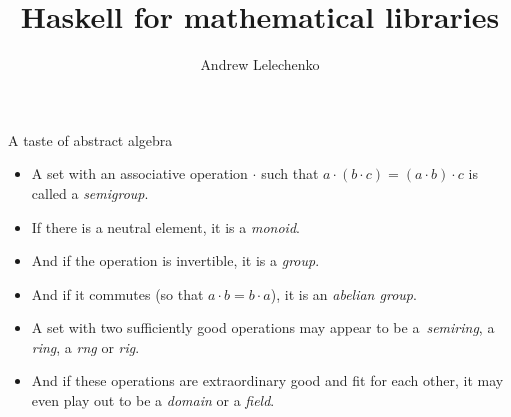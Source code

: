 \documentclass[handout]{beamer}
\begin{document}
\title{Haskell for mathematical libraries}
\author[Andrew Lelechenko]{Andrew Lelechenko}

\begin{frame}{A taste of abstract algebra}

\begin{itemize}[<+->]
\item A set with an associative operation $\cdot$ such that $a\cdot(b\cdot c) = (a\cdot b)\cdot c$
  is called a {\em semigroup}.
\item If there is a neutral element, it is a {\em monoid}.
\item And if the operation is invertible, it is a {\em group}.
\item And if it commutes (so that $a \cdot b = b \cdot a$), it is an {\em abelian group}.

    \bigskip

\item A set with two sufficiently good operations may appear to be
  a~{\em semiring}, a {\em ring}, a {\em rng} or {\em rig}.
\item And if these operations are extraordinary good and fit for each other,
  it may even play out
  to be a {\em domain} or a {\em field}.
\end{itemize}

\end{frame}
\end{document}
